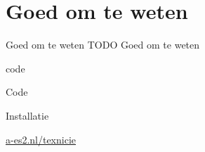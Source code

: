 \documentclass[presentatie.tex]{subfiles}
\begin{document}
\section{Goed om te weten}

\clearrecentlist
    
\begin{frame}{Goed om te weten}
    TODO Goed om te weten
\end{frame}

\begin{saveblock}{code}
	\begin{highlightblock}[gobble=8,linewidth=0.5\textwidth,framexleftmargin=0.25em]
        Code
	\end{highlightblock}
\end{saveblock}

\begin{frame}
    {Installatie}

    \centering\url{a-es2.nl/texnicie}
\end{frame}
\end{document}
